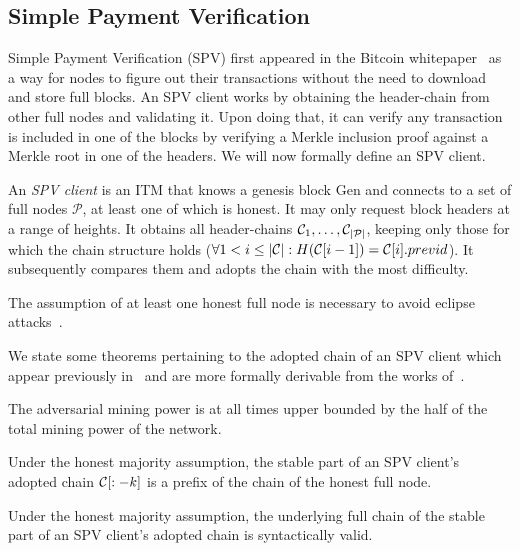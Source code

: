 \subsection{Simple Payment Verification}
Simple Payment Verification (SPV) first appeared in the Bitcoin whitepaper~\cite{bitcoin} as a way for nodes to figure out their transactions without the need to download and store full blocks. An SPV client works by obtaining the header-chain from other full nodes and validating it. Upon doing that, it can verify any transaction is included in one of the blocks by verifying a Merkle inclusion proof against a Merkle root in one of the headers. We will now formally define an SPV client.

\begin{definition}
An \emph{SPV client} is an ITM that knows a genesis block \textsf{Gen} and connects to a set of full nodes $\mathcal{P}$, at least one of which is honest. It may only request block headers at a range of heights. It obtains all header-chains $\mathcal{C}_1, \dots, \mathcal{C}_{|\mathcal{P}|}$, keeping only those for which the chain structure holds ($\forall 1 < i \le |\mathcal{C}|: H(\mathcal{C}[i-1]) = \mathcal{C}[i].previd$). It subsequently compares them and adopts the chain with the most difficulty.
\end{definition}

The assumption of at least one honest full node is necessary to avoid eclipse attacks~\cite{eclipse,eclipse-ethereum}.

We state some theorems pertaining to the adopted chain of an SPV client which appear previously in~\cite{sok} and are more formally derivable from the works of~\cite{backbone,garay2017bitcoin,pass2017analysis}.

\begin{definition}
The adversarial mining power is at all times upper bounded by the half of the total mining power of the network.
\end{definition}

\begin{theorem}
Under the honest majority assumption, the stable part of an SPV client's adopted chain $\mathcal{C}[:-k]$ is a prefix of the chain of the honest full node.
\end{theorem}

\begin{corollary}
Under the honest majority assumption, the underlying full chain of the stable part of an SPV client's adopted chain is syntactically valid.
\end{corollary}

